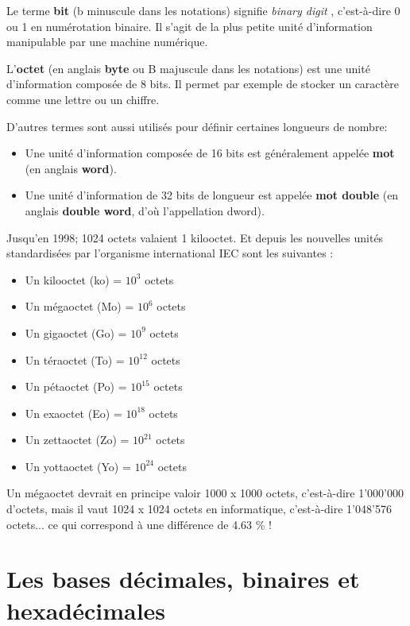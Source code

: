 \documentclass[11pt, a4paper]{book}
\begin{document}
\begin{defi}
Le terme {\bf bit} (b minuscule dans les notations) signifie {\it binary digit }, c'est-à-dire 0 ou 1 en numérotation binaire. Il s'agit de la plus petite unité d'information manipulable par une machine numérique. 


L'{\bf octet} (en anglais {\bf byte} ou B majuscule dans les notations) est une unité d'information composée de 8 bits. Il permet par exemple de stocker un caractère comme une lettre ou un chiffre.
\end{defi}

D'autres termes sont aussi utilisés pour définir certaines longueurs de nombre:
\begin{itemize}
\item Une unité d'information composée de 16 bits est généralement appelée {\bf mot} (en anglais {\bf word}).

\item Une unité d'information de 32 bits de longueur est appelée {\bf mot double} (en anglais {\bf double word}, d'où l'appellation dword).
\end{itemize}

Jusqu'en 1998; 1024 octets valaient 1 kilooctet. Et depuis les nouvelles unités standardisées par l'organisme international IEC sont les suivantes :
\begin{itemize}
\item Un kilooctet (ko) = $10^3$ octets
\item Un mégaoctet (Mo) = $10^6$ octets
\item Un gigaoctet (Go) = $10^9$ octets
\item Un téraoctet (To) = $10^{12}$ octets
\item Un pétaoctet (Po) = $10^{15}$ octets
\item Un exaoctet (Eo) = $10^{18}$ octets
\item Un zettaoctet (Zo) = $10^{21}$ octets
\item Un yottaoctet (Yo) = $10^{24}$ octets
\end{itemize}

\begin{remarque}
Un mégaoctet devrait en principe valoir 1000 x 1000 octets, c'est-à-dire 1'000'000 d'octets, mais il vaut 1024 x 1024 octets en informatique, c'est-à-dire 1'048'576 octets... ce qui correspond à une différence de 4.63 \% !
\end{remarque}

\section{Les bases décimales, binaires et hexadécimales}
\end{document}

